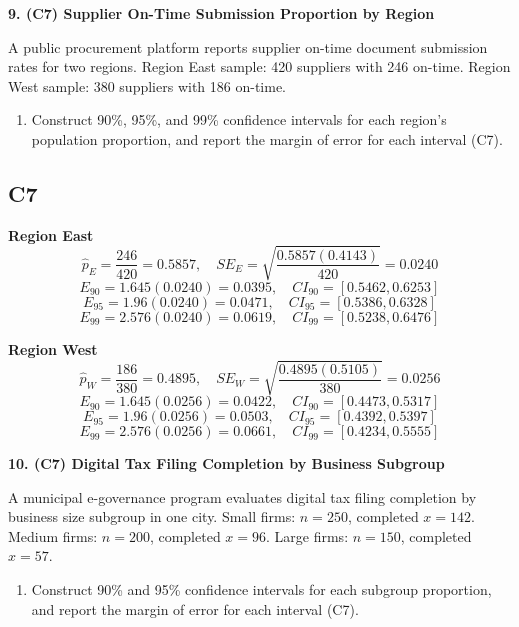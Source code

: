 \begin{ExamProblems}
		\newpage
		\item
		\textbf{9. (C7) Supplier On-Time Submission Proportion by Region}
		
		A public procurement platform reports supplier on-time document submission rates for two regions.
		Region East sample: 420 suppliers with 246 on-time.
		Region West sample: 380 suppliers with 186 on-time.
		\begin{enumerate}
			\item Construct 90\%, 95\%, and 99\% confidence intervals for each region's population proportion, and report the margin of error for each interval (C7).
		\end{enumerate}
		
		\subsection*{C7}
		\textbf{Region East}
		\[
		\hat{p}_E=\frac{246}{420}=0.5857,
		\quad SE_E=\sqrt{\frac{0.5857(0.4143)}{420}}=0.0240
		\]
		\[
		E_{90}=1.645(0.0240)=0.0395,\quad CI_{90}=[0.5462,0.6253]
		\]
		\[
		E_{95}=1.96(0.0240)=0.0471,\quad CI_{95}=[0.5386,0.6328]
		\]
		\[
		E_{99}=2.576(0.0240)=0.0619,\quad CI_{99}=[0.5238,0.6476]
		\]
		
		\textbf{Region West}
		\[
		\hat{p}_W=\frac{186}{380}=0.4895,
		\quad SE_W=\sqrt{\frac{0.4895(0.5105)}{380}}=0.0256
		\]
		\[
		E_{90}=1.645(0.0256)=0.0422,\quad CI_{90}=[0.4473,0.5317]
		\]
		\[
		E_{95}=1.96(0.0256)=0.0503,\quad CI_{95}=[0.4392,0.5397]
		\]
		\[
		E_{99}=2.576(0.0256)=0.0661,\quad CI_{99}=[0.4234,0.5555]
		\]
		
		\newpage
		\item
		\textbf{10. (C7) Digital Tax Filing Completion by Business Subgroup}
		
		A municipal e-governance program evaluates digital tax filing completion by business size subgroup in one city.
		Small firms: $n=250$, completed $x=142$.
		Medium firms: $n=200$, completed $x=96$.
		Large firms: $n=150$, completed $x=57$.
		\begin{enumerate}
			\item Construct 90\% and 95\% confidence intervals for each subgroup proportion, and report the margin of error for each interval (C7).
		\end{enumerate}
		

\end{ExamProblems}
